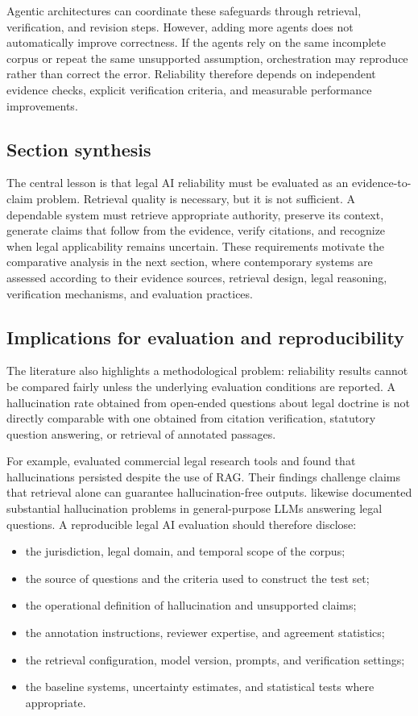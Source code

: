 Agentic architectures can coordinate these safeguards through retrieval, verification, and revision
steps. However, adding more agents does not automatically improve correctness. If the agents rely on the
same incomplete corpus or repeat the same unsupported assumption, orchestration may reproduce rather
than correct the error. Reliability therefore depends on independent evidence checks, explicit
verification criteria, and measurable performance improvements.

\subsection{Section synthesis}

The central lesson is that legal AI reliability must be evaluated as an evidence-to-claim problem.
Retrieval quality is necessary, but it is not sufficient. A dependable system must retrieve appropriate
authority, preserve its context, generate claims that follow from the evidence, verify citations, and
recognize when legal applicability remains uncertain. These requirements motivate the comparative
analysis in the next section, where contemporary systems are assessed according to their evidence
sources, retrieval design, legal reasoning, verification mechanisms, and evaluation practices.

\subsection{Implications for evaluation and reproducibility}

The literature also highlights a methodological problem: reliability results cannot be compared fairly
unless the underlying evaluation conditions are reported. A hallucination rate obtained from open-ended
questions about legal doctrine is not directly comparable with one obtained from citation verification,
statutory question answering, or retrieval of annotated passages.

For example, \citet{magesh2025} evaluated commercial legal research tools and found that hallucinations
persisted despite the use of RAG. Their findings challenge claims that retrieval alone can guarantee
hallucination-free outputs. \citet{dahl2024} likewise documented substantial hallucination problems in
general-purpose LLMs answering legal questions. A reproducible legal AI evaluation should therefore
disclose:
\begin{itemize}[leftmargin=1.4em, itemsep=2pt, topsep=2pt]
\item the jurisdiction, legal domain, and temporal scope of the corpus;
\item the source of questions and the criteria used to construct the test set;
\item the operational definition of hallucination and unsupported claims;
\item the annotation instructions, reviewer expertise, and agreement statistics;
\item the retrieval configuration, model version, prompts, and verification settings;
\item the baseline systems, uncertainty estimates, and statistical tests where appropriate.
\end{itemize}

